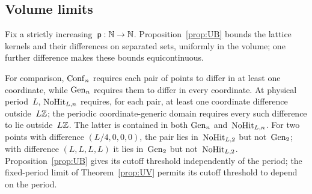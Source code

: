 \subsection{Volume limits}\label{sec:partII-F.1}

Fix a strictly increasing~$\mathsf p:\mathbb{N}\to\mathbb{N}$. Proposition~\ref{prop:UB} bounds the lattice kernels and their differences on separated sets, uniformly in the volume; one further difference makes these bounds equicontinuous.

For comparison, $\mathrm{Conf}_{n}$ requires each pair of points to differ in at least one coordinate, while $\mathrm{Gen}_{n}$ requires them to differ in every coordinate. At physical period~$L$, $\mathrm{NoHit}_{L,n}$ requires, for each pair, at least one coordinate difference outside~$L\mathbb{Z}$; the periodic coordinate-generic domain requires every such difference to lie outside~$L\mathbb{Z}$. The latter is contained in both $\mathrm{Gen}_{n}$ and~$\mathrm{NoHit}_{L,n}$. For two points with difference $(L/4,0,0,0)$, the pair lies in~$\mathrm{NoHit}_{L,2}$ but not~$\mathrm{Gen}_{2}$; with difference $(L,L,L,L)$ it lies in~$\mathrm{Gen}_{2}$ but not~$\mathrm{NoHit}_{L,2}$. Proposition~\ref{prop:UB} gives its cutoff threshold independently of the period; the fixed-period limit of Theorem~\ref{prop:UV} permits its cutoff threshold to depend on the period.

